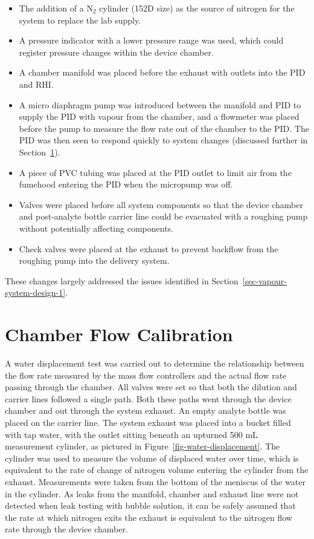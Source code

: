 \documentclass[
  a4paper,
]{scrbook}
\begin{document}
\begin{itemize}
\item
  The addition of a N\(_2\) cylinder (152D size) as the source of
  nitrogen for the system to replace the lab supply.
\item
  A pressure indicator with a lower pressure range was used, which could
  register pressure changes within the device chamber.
\item
  A chamber manifold was placed before the exhaust with outlets into the
  PID and RHI.
\item
  A micro diaphragm pump was introduced between the manifold and PID to
  supply the PID with vapour from the chamber, and a flowmeter was
  placed before the pump to measure the flow rate out of the chamber to
  the PID. The PID was then seen to respond quickly to system changes
  (discussed further in Section~\ref{sec-calibration}).
\item
  A piece of PVC tubing was placed at the PID outlet to limit air from
  the fumehood entering the PID when the micropump was off.
\item
  Valves were placed before all system components so that the device
  chamber and post-analyte bottle carrier line could be evacuated with a
  roughing pump without potentially affecting components.
\item
  Check valves were placed at the exhaust to prevent backflow from the
  roughing pump into the delivery system.
\end{itemize}

These changes largely addressed the issues identified in
Section~\ref{sec-vapour-system-design-1}.

\hypertarget{sec-calibration}{%
\section{Chamber Flow Calibration}\label{sec-calibration}}

A water displacement test was carried out to determine the relationship
between the flow rate measured by the mass flow controllers and the
actual flow rate passing through the chamber. All valves were set so
that both the dilution and carrier lines followed a single path. Both
these paths went through the device chamber and out through the system
exhaust. An empty analyte bottle was placed on the carrier line. The
system exhaust was placed into a bucket filled with tap water, with the
outlet sitting beneath an upturned 500 mL measurement cylinder, as
pictured in Figure~\ref{fig-water-displacement}. The cylinder was used
to measure the volume of displaced water over time, which is equivalent
to the rate of change of nitrogen volume entering the cylinder from the
exhaust. Measurements were taken from the bottom of the meniscus of the
water in the cylinder. As leaks from the manifold, chamber and exhaust
line were not detected when leak testing with bubble solution, it can be
safely assumed that the rate at which nitrogen exits the exhaust is
equivalent to the nitrogen flow rate through the device chamber.
\end{document}
